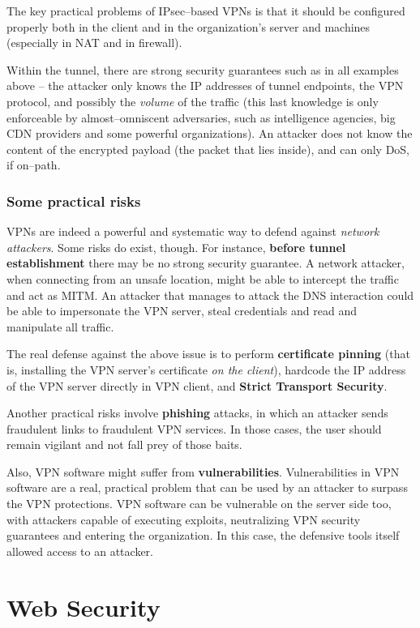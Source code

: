 \documentclass[10pt]{extbook}
\begin{document}
The key practical problems of IPsec--based VPNs is that it should be configured
properly both in the client and in the organization's server and machines
(especially in NAT and in firewall).

Within the tunnel, there are strong security guarantees such as in all examples
above -- the attacker only knows the IP addresses of tunnel endpoints, the VPN
protocol, and possibly the \emph{volume} of the traffic (this last knowledge is
only enforceable by almost--omniscent adversaries, such as intelligence
agencies, big CDN providers and some powerful organizations). An attacker does
not know the content of the encrypted payload (the packet that lies inside),
and can only DoS, if on--path.

\subsection{Some practical risks}

VPNs are indeed a powerful and systematic way to defend against \emph{network
attackers}. Some risks do exist, though. For instance, \textbf{before tunnel
establishment} there may be no strong security guarantee. A network attacker,
when connecting from an unsafe location, might be able to intercept the traffic
and act as MITM. An attacker that manages to attack the DNS interaction could
be able to impersonate the VPN server, steal credentials and read and
manipulate all traffic.

The real defense against the above issue is to perform \textbf{certificate
pinning} (that is, installing the VPN server's certificate \emph{on the
client}), hardcode the IP address of the VPN server directly in VPN client, and
\textbf{Strict Transport Security}.

Another practical risks involve \textbf{phishing} attacks, in which an attacker
sends fraudulent links to fraudulent VPN services. In those cases, the user
should remain vigilant and not fall prey of those baits.

Also, VPN software might suffer from \textbf{vulnerabilities}. Vulnerabilities
in VPN software are a real, practical problem that can be used by an attacker
to surpass the VPN protections. VPN software can be vulnerable on the server
side too, with attackers capable of executing exploits, neutralizing VPN
security guarantees and entering the organization. In this case, the defensive
tools itself allowed access to an attacker.

\chapter{Web Security}
\end{document}
